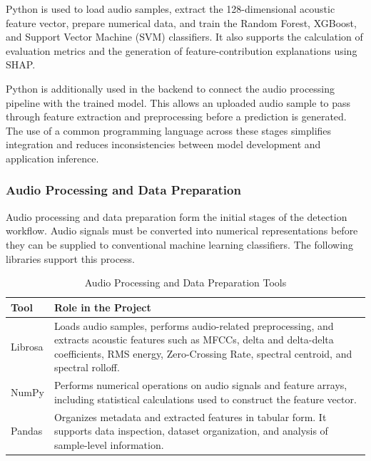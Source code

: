 \documentclass[12pt,a4paper]{report}
\begin{document}
Python is used to load audio samples, extract the 128-dimensional acoustic feature vector, prepare numerical data, and train the Random Forest, XGBoost, and Support Vector Machine (SVM) classifiers. It also supports the calculation of evaluation metrics and the generation of feature-contribution explanations using SHAP.

Python is additionally used in the backend to connect the audio processing pipeline with the trained model. This allows an uploaded audio sample to pass through feature extraction and preprocessing before a prediction is generated. The use of a common programming language across these stages simplifies integration and reduces inconsistencies between model development and application inference.


\subsubsection{Audio Processing and Data Preparation}

Audio processing and data preparation form the initial stages of the detection workflow. Audio signals must be converted into numerical representations before they can be supplied to conventional machine learning classifiers. The following libraries support this process.

\begin{table}[H]
\centering
\small
\renewcommand{\arraystretch}{1.35}

\begin{tabularx}{\textwidth}{
    >{\raggedright\arraybackslash}p{}
    >{\raggedright\arraybackslash}X
}
\toprule
\textbf{Tool} & \textbf{Role in the Project} \\
\midrule

Librosa &
Loads audio samples, performs audio-related preprocessing, and extracts acoustic features such as MFCCs, delta and delta-delta coefficients, RMS energy, Zero-Crossing Rate, spectral centroid, and spectral rolloff. \\

NumPy &
Performs numerical operations on audio signals and feature arrays, including statistical calculations used to construct the feature vector. \\

Pandas &
Organizes metadata and extracted features in tabular form. It supports data inspection, dataset organization, and analysis of sample-level information. \\

\bottomrule
\end{tabularx}

\caption{Audio Processing and Data Preparation Tools}
\label{tab:audio-processing-tools}
\end{table}
\end{document}
